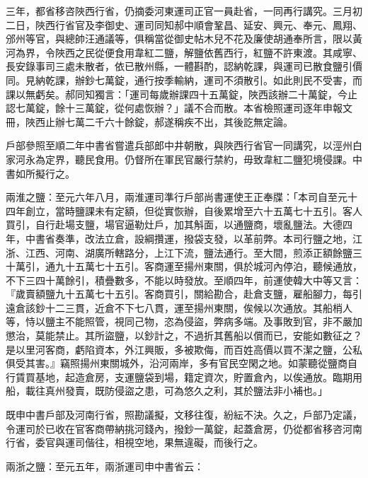 \begin{pinyinscope}
 三年，都省移咨陜西行省，仍摘委河東運司正官一員赴省，一同再行講究。三月初二日，陜西行省官及李御史、運司同知郝中順會鞏昌、延安、興元、奉元、鳳翔、邠州等官，與總帥汪通議等，俱稱當從御史帖木兒不花及廉使胡通奉所言，限以黃河為界，令陜西之民從便食用韋紅二鹽，解鹽依舊西行，紅鹽不許東渡。其咸寧、長安錄事司三處未散者，依已散州縣，一體斟酌，認納乾課，與運司已散食鹽引價同。見納乾課，辦鈔七萬錠，通行按季輸納，運司不須散引。如此則民不受害，而課以無虧矣。郝同知獨言：「運司每歲辦課四十五萬錠，陜西該辦二十萬錠，今止認七萬錠，餘十三萬錠，從何處恢辦？」議不合而散。本省檢照運司逐年申報文冊，陜西止辦七萬二千六十餘錠，郝遂稱疾不出，其後訖無定論。



 戶部參照至順二年中書省嘗遣兵部郎中井朝散，與陜西行省官一同講究，以涇州白家河永為定界，聽民食用。仍督所在軍民官嚴行禁約，毋致韋紅二鹽犯境侵課。中書如所擬行之。



 兩淮之鹽：至元六年八月，兩淮運司準行戶部尚書運使王正奉牒：「本司自至元十四年創立，當時鹽課未有定額，但從實恢辦，自後累增至六十五萬七十五引。客人買引，自行赴場支鹽，場官逼勒灶戶，加其斛面，以通鹽商，壞亂鹽法。大德四年，中書省奏準，改法立倉，設綱攢運，撥袋支發，以革前弊。本司行鹽之地，江浙、江西、河南、湖廣所轄路分，上江下流，鹽法通行。至大間，煎添正額餘鹽三十萬引，通九十五萬七十五引。客商運至揚州東關，俱於城河內停泊，聽候通放，不下三四十萬餘引，積疊數多，不能以時發放。至順四年，前運使韓大中等又言：『歲賣額鹽九十五萬七十五引。客商買引，關給勘合，赴倉支鹽，雇船腳力，每引遠倉該鈔十二三貫，近倉不下七八貫，運至揚州東關，俟候以次通放。其船梢人等，恃以鹽主不能照管，視同己物，恣為侵盜，弊病多端。及事敗到官，非不嚴加懲治，莫能禁止。其所盜鹽，以鈔計之，不過折其舊船以償而已，安能如數征之？是以里河客商，虧陷資本，外江興販，多被欺侮，而百姓高價以買不潔之鹽，公私俱受其害。』竊照揚州東關城外，沿河兩岸，多有官民空閑之地。如蒙聽從鹽商自行賃買基地，起造倉房，支運鹽袋到場，籍定資次，貯置倉內，以俟通放。臨期用船，載往真州發賣，既防侵盜之患，可為悠久之利，其於鹽法非小補也。」



 既申中書戶部及河南行省，照勘議擬，文移往復，紛紜不決。久之，戶部乃定議，令運司於已收在官客商帶納挑河錢內，撥鈔一萬錠，起蓋倉房，仍從都省移咨河南行省，委官與運司偕往，相視空地，果無違礙，而後行之。



 兩浙之鹽：至元五年，兩浙運司申中書省云：




\end{pinyinscope}
